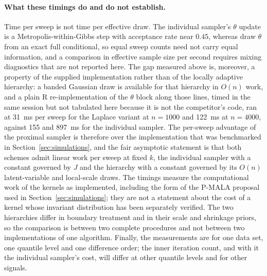 \paragraph{What these timings do and do not establish.} Time per sweep is not time per effective draw. The individual sampler's $\theta$ update is a Metropolis-within-Gibbs step with acceptance rate near $0.45$, whereas \citet{onizuka2024fast} draw $\theta$ from an exact full conditional, so equal sweep counts need not carry equal information, and a comparison in effective sample size per second requires mixing diagnostics that are not reported here. The gap measured above is, moreover, a property of the supplied implementation rather than of the locally adaptive hierarchy: a banded Gaussian draw is available for that hierarchy in $O(n)$ work, and a plain R re-implementation of the $\theta$ block along those lines, timed in the same session but not tabulated here because it is not the competitor's code, ran at 31~ms per sweep for the Laplace variant at $n = 1000$ and 122~ms at $n = 4000$, against 155 and 897~ms for the individual sampler. The per-sweep advantage of the proximal sampler is therefore over the implementation that was benchmarked in Section~\ref{sec:simulations}, and the fair asymptotic statement is that both schemes admit linear work per sweep at fixed $k$, the individual sampler with a constant governed by $J$ and the hierarchy with a constant governed by its $O(n)$ latent-variable and local-scale draws. The timings measure the computational work of the kernels as implemented, including the form of the P-MALA proposal used in Section~\ref{sec:simulations}; they are not a statement about the cost of a kernel whose invariant distribution has been separately verified. The two hierarchies differ in boundary treatment and in their scale and shrinkage priors, so the comparison is between two complete procedures and not between two implementations of one algorithm. Finally, the measurements are for one data set, one quantile level and one difference order; the inner iteration count, and with it the individual sampler's cost, will differ at other quantile levels and for other signals.
